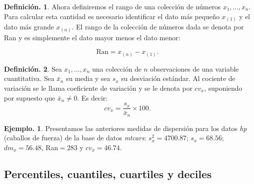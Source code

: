 \documentclass[]{book}
\theoremstyle{definition}
\newtheorem{definition}{Definición.}[chapter]
\theoremstyle{definition}
\newtheorem{example}{Ejemplo.}[chapter]
\theoremstyle{definition}
\theoremstyle{remark}
\begin{document}
\begin{definition}
\protect\hypertarget{def:unnamed-chunk-91}{}{\label{def:unnamed-chunk-91} }
Ahora definiremos el rango de una colección de números
\(x_1, \ldots, x_n\). Para
calcular esta cantidad es necesario identificar el dato
más pequeño \(x_{(1)}\) y el
dato más grande \(x_{(n)}\). El rango de la colección de
números dada se denota
por Ran y es simplemente el dato mayor menos el dato
menor:

\[ \mbox{Ran} = x_{(n)} - x_{(1)}.   \]
\end{definition}

\begin{definition}
\protect\hypertarget{def:unnamed-chunk-92}{}{\label{def:unnamed-chunk-92} }
Sea \(x_1, \ldots , x_n\) una colección de \(n\)
observaciones de una variable cuantitativa.
Sea \(\bar{x}_n\) su media y sea \(s_x\) su desviación
estándar. Al cociente de variación se le llama
coeficiente de variación y se le denota por \(cv_x\),
suponiendo por supuesto que \(\bar{x}_n \neq 0\). Es decir:
\[ cv_x = \frac{s_x}{\bar{x}_n} \times 100.\]
\end{definition}

\begin{example}
\protect\hypertarget{exm:unnamed-chunk-93}{}{\label{exm:unnamed-chunk-93} }Presentamos las anteriores medidas de dispersión para
los datos \emph{hp} (caballos de fuerza) de la
base de datos \emph{mtcars}: \(s_x^2 = 4700.87\); \(s_x =68.56\);
\(dm_x= 56.48\), Ran\(= 283\) y \(cv_x= 46.74\).\\
\end{example}

\hypertarget{percentiles-cuantiles-cuartiles-y-deciles}{%
\subsection{Percentiles, cuantiles, cuartiles y deciles}\label{percentiles-cuantiles-cuartiles-y-deciles}}
\end{document}

